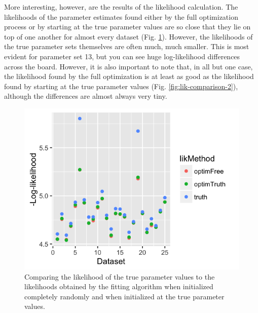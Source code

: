 \documentclass[12pt,reqno,final,pdftex]{amsart}\usepackage[]{graphicx}\usepackage[]{color}
\newenvironment{knitrout}{}{} %
\theoremstyle{plain}
\numberwithin{equation}{part}
\begin{document}
More interesting, however, are the results of the likelihood calculation.
The likelihoods of the parameter estimates found either by the full optimization process or by starting at the true parameter values are so close that they lie on top of one another for almost every dataset (Fig. \ref{fig:lik-comparison}).
However, the likelihoods of the true parameter sets themselves are often much, much smaller.
This is most evident for parameter set 13, but you can see huge log-likelihood differences across the board.
However, it is also important to note that, in all but one case, the likelihood found by the full optimization is at least as good as the likelihood found by starting at the true parameter values (Fig. \ref{fig:lik-comparison-2}), although the differences are almost always very tiny.

\begin{knitrout}\scriptsize
{}\color{fgcolor}\begin{figure}

\includegraphics[width=\linewidth]{figure/lik-comparison-1} \hfill{}

\caption[Comparing the likelihood of the true parameter values to the likelihoods obtained by the fitting algorithm when initialized completely randomly and when initialized at the true parameter values]{Comparing the likelihood of the true parameter values to the likelihoods obtained by the fitting algorithm when initialized completely randomly and when initialized at the true parameter values.}\label{fig:lik-comparison}
\end{figure}


\end{knitrout}
\end{document}
